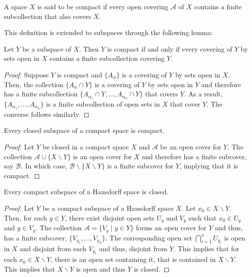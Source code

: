 \begin{definition}[Compact]
    A space $X$ is said to be compact if every open covering $\mathscr{A}$ of $X$ contains a finite subcollection that also covers $X$.
\end{definition}

This definition is extended to subspaces through the following lemma:
\begin{lemma}
    Let $Y$ be a subspace of $X$. Then $Y$ is compact if and only if every covering of $Y$ by sets open in $X$ contains a finite subcollection covering $Y$.
\end{lemma}
\begin{proof}
    Suppose $Y$ is compact and $\{A_\alpha\}$ is a covering of $Y$ by sets open in $X$. Then, the collection $\{A_\alpha\cap Y\}$ is a covering of $Y$ by sets open in $Y$ and therefore has a finite subcollection $\{A_{\alpha_1}\cap Y,\ldots, A_{\alpha_n}\cap Y\}$ that covers $Y$. As a result, $\{A_{\alpha_1},\ldots,A_{\alpha_n}\}$ is a finite subcollection of open sets in $X$ that cover $Y$. The converse follows similarly.
\end{proof}

\begin{theorem}
    Every closed subspace of a compact space is compact.
\end{theorem}
\begin{proof}
    Let $Y$ be closed in a compact space $X$ and $\mathscr{A}$ be an open cover for $Y$. The collection $\mathscr{A}\cup\{X\backslash Y\}$ is an open cover for $X$ and therefore has a finite subcover, say $\mathscr{B}$. In which case, $\mathscr{B}\backslash\{X\backslash Y\}$ is a finite subcover for $Y$, implying that it is compact.
\end{proof}

\begin{theorem}
    Every compact subspace of a Hausdorff space is closed.
\end{theorem}
\begin{proof}
    Let $Y$ be a compact subspace of a Hausdorff space $X$. Let $x_0\in X\backslash Y$. Then, for each $y\in Y$, there exist disjoint open sets $U_y$ and $V_y$ such that $x_0\in U_y$ and $y\in V_y$. The collection $\mathscr{A} = \{V_y\mid y\in Y\}$ forms an open cover for $Y$ and thus, has a finite subcover, $\{V_{y_1},\ldots,V_{y_n}\}$. The corresponding open set $\bigcap_{i=1}^n U_{y_i}$ is open in $X$ and disjoint from each $V_{y_i}$ and thus, disjoint from $Y$. This implies that for each $x_0\in X\backslash Y$, there is an open set containing it, that is contained in $X\backslash Y$. This implies that $X\backslash Y$ is open and thus $Y$ is closed.
\end{proof}

